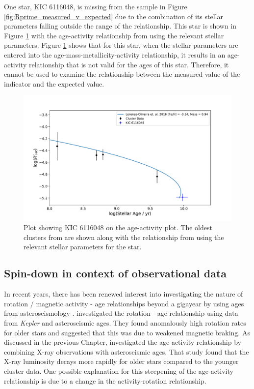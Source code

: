 One star, KIC 6116048, is missing from the sample in Figure \ref{fig:Rprime_measured_v_expected} due to the combination of its stellar parameters falling outside the range of the \citet{Lorenzo_Oliveira_etal_2016} relationship. This star is shown in Figure \ref{fig:LO_invalid_star} with the age-activity relationship from \citet{Lorenzo_Oliveira_etal_2016} using the relevant stellar parameters. Figure \ref{fig:LO_invalid_star} shows that for this star, when the stellar parameters are entered into the age-mass-metallicity-activity relationship, it results in an age-activity relationship that is not valid for the ages of this star. Therefore, it cannot be used to examine the relationship between the measured value of the \Rprime indicator and the expected value.

\begin{figure}
	\centering
    \includegraphics[scale=0.55]{Figures/4-Chromospheric_age/rhk_KIC_6116048.pdf}
    \caption[Plot of age-activity relationship for stellar parameters of KIC 6116048]{Plot showing KIC 6116048 on the age-activity plot. The oldest clusters from \citet{Mamajek_Hillenbrand_2008} are shown along with the relationship from \citet{Lorenzo_Oliveira_etal_2016} using the relevant stellar parameters for the star.}
	\label{fig:LO_invalid_star}
\end{figure}

\subsection{Spin-down in context of observational data}

In recent years, there has been renewed interest into investigating the nature of rotation / magnetic activity - age relationships beyond a gigayear by using ages from asteroseismology \citep{van_Saders_etal_2016,Booth_etal_2017}. \citet{van_Saders_etal_2016} investigated the rotation - age relationship using data from \textit{Kepler} and asteroseismic ages. They found anomalously high rotation rates for older stars and suggested that this was due to weakened magnetic braking. As discussed in the previous Chapter, \citet{Booth_etal_2017} investigated the age-activity relationship by combining X-ray observations with asteroseismic ages. That study found that the X-ray luminosity decays more rapidly for older stars compared to the younger cluster data. One possible explanation for this steepening of the age-activity relationship is due to a change in the activity-rotation relationship.

